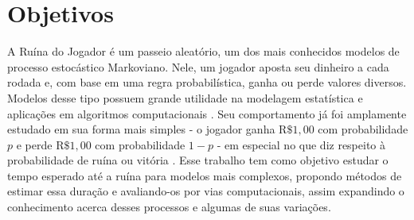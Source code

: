 \documentclass[a4paper,10pt,twocolumn]{article}
\begin{document}
\pagestyle{fancy}
\fancyhead{}
\renewcommand{\headrulewidth}{0pt}


\section{Objetivos}

A Ruína do Jogador é um passeio aleatório, um dos mais conhecidos modelos de 
processo estocástico Markoviano. Nele, um jogador aposta seu dinheiro a cada 
rodada e, com base em uma regra probabilística, ganha ou perde valores diversos.
Modelos desse tipo possuem grande utilidade na modelagem estatística e
aplicações em algoritmos computacionais \cite{ross_markov_2019}. Seu
comportamento já foi amplamente estudado em sua forma mais simples - o jogador 
ganha $\mathrm{R}\$1,00$ com probabilidade $p$ e perde $\mathrm{R}\$1,00$ com 
probabilidade $1-p$ - em especial no que diz respeito à probabilidade de ruína ou vitória 
\cite{ross_introduction_2019}. Esse trabalho tem como objetivo estudar o tempo 
esperado até a ruína para modelos mais complexos, propondo métodos de estimar 
essa duração e avaliando-os por vias computacionais, assim expandindo o 
conhecimento acerca desses processos e algumas de suas variações.
\end{document}
